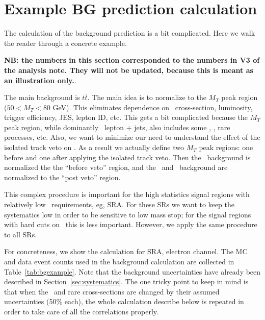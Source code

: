 \section{Example BG prediction calculation}
\label{BGexample}

The calculation of the background prediction is a bit complicated.
Here we walk the reader through a concrete example. 

 {\bf NB: the numbers
in this section corresponded to the numbers in V3 of the analysis note. 
They will not be updated, because this is meant as an illustration only.}.

The main background is $t\bar{t}$.
The main idea is to normalize to the $M_T$ peak region ($50 < M_T < 80$ GeV).
This eliminates dependence on \ttbar\ cross-section, luminosity,
trigger efficiency, JES, lepton ID, etc.  This gets a bit complicated because
the $M_T$ peak region, while dominantly \ttbar\ lepton $+$ jets,
also includes some \wjets, \ttdl, rare processes, etc.  Also, we want
to minimize our need to understand the effect of the isolated 
track veto on \ttsl.  As a result we actually define two $M_T$ peak
regions: one before and one after applying the isolated track veto.
Then the \ttdl\ background is normalized the the ``before veto'' region,
and the \ttsl\ and \wjets\ background are normalized to the ``post veto''
region.

This complex procedure is important for the high statistics signal regions 
with relatively low \met\ requirements, eg, SRA.  For these SRs we want to keep the 
systematics low in order to be sensitive to low mass stop; for the signal regions
with hard cuts on \met\, this is less important.  However, we apply the same 
procedure to all SRs.

For concreteness, we show the calculation for SRA, electron channel.  The MC and data
event counts used in the background calculation are collected in Table~\ref{tab:bgexample}.
Note that the background uncertainties have already been described 
in Section~\ref{sec:systematics}.  The one tricky point to keep in mind is that 
when the \wjets\ and rare cross-sections are changed by their assumed uncertainties
(50\% each), the whole calculation describe below is repeated in order to take care
of all the correlations properly.


